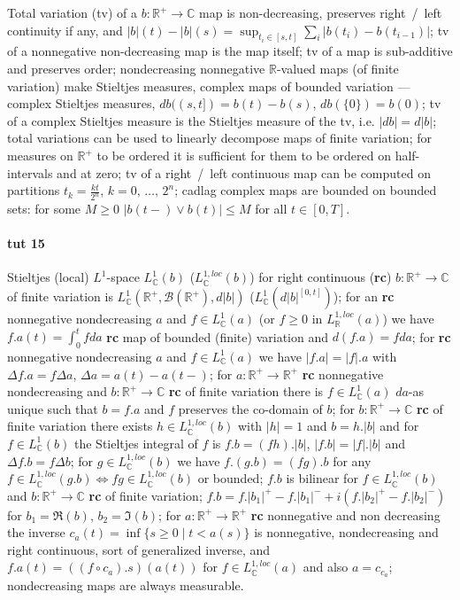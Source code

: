 \documentclass[a4paper]{article}
\newcommand{\Bcal}{\mathcal{B}}
\newcommand{\real}{\mathbb{R}}
\newcommand{\cplx}{\mathbb{C}}
\begin{document}
Total variation (tv) of a $b\colon \real^+ \to \cplx$ map is non-decreasing, preserves right~/~left continuity if any, and $|b|(t) - |b|(s) = \sup_{t_i \in [s, t]} \sum_i |b(t_i) - b(t_{i-1})|$;
tv of a nonnegative non-decreasing map is the map itself;
tv of a map is sub-additive and preserves order;
nondecreasing nonnegative $\real$-valued maps (of finite variation) make Stieltjes measures, complex maps of bounded variation --- complex Stieltjes measures, $db((s,t]) = b(t) - b(s)$, $db(\{0\}) = b(0)$;
tv of a complex Stieltjes measure is the Stieltjes measure of the tv, i.e. $|db| = d|b|$;
total variations can be used to linearly decompose maps of finite variation;
for measures on $\real^+$ to be ordered it is sufficient for them to be ordered on half-intervals and at zero;
tv of a right~/~left continuous map can be computed on partitions $t_k = \tfrac{k t}{2^n}$, $k=0,\, \ldots,\,2^n$;
cadlag complex maps are bounded on bounded sets: for some $M\geq 0$ $|b(t-) \vee b(t)| \leq M$ for all $t \in [0, T]$.



\paragraph{tut 15} %
\label{par:tut_15}

Stieltjes (local) $L^1$-space $L^1_\cplx(b)$ ($L^{1,loc}_\cplx(b)$) for right continuous ({\bf rc}) $b\colon \real^+ \to \cplx$ of finite variation is $L_\cplx^1(\real^+, \Bcal(\real^+), d|b|)$ ($L_\cplx^1(d|b|^{[0,t]})$);
for an {\bf rc} nonnegative nondecreasing $a$ and $f \in L^1_\cplx(a)$ (or $f \geq 0$ in $L^{1,loc}_\real(a)$) we have $f.a(t) = \int_0^t f da$ {\bf rc} map of bounded (finite) variation and $d(f.a) = f da$;
for {\bf rc} nonnegative nondecreasing $a$ and $f \in L^1_\cplx(a)$ we have $|f.a| = |f|.a$ with $\Delta f.a = f\Delta a$, $\Delta a = a(t) - a(t-)$;
for $a\colon \real^+ \to \real^+$ {\bf rc} nonnegative nondecreasing and $b\colon \real^+ \to \cplx$ {\bf rc} of finite variation there is $f \in L^1_\cplx(a)$ $da$-as unique such that $b = f.a$ and $f$ preserves the co-domain of $b$;
for $b\colon \real^+ \to \cplx$ {\bf rc} of finite variation there exists $h \in L^{1,loc}_\cplx(b)$ with $|h|=1$ and $b = h.|b|$ and for $f \in L^1_\cplx(b)$ the Stieltjes integral of $f$ is $f.b = (f h).|b|$, $|f.b| = |f|.|b|$ and $\Delta f.b = f \Delta b$;
for $g \in L^{1,loc}_\cplx(b)$ we have $f.(g.b) = (fg).b$ for any $f \in L^{1,loc}_\cplx(g.b) \Leftrightarrow fg \in L^{1,loc}_\cplx(b)$ or bounded;
$f.b$ is bilinear for $f \in L^{1,loc}_\cplx(b)$ and $b\colon \real^+ \to \cplx$ {\bf rc} of finite variation;
$f.b = f.|b_1|^+ - f.|b_1|^- + i(f.|b_2|^+ - f.|b_2|^-)$ for $b_1 = \Re(b)$, $b_2 = \Im(b)$;
for $a\colon \real^+ \to \real^+$ {\bf rc} nonnegative and non decreasing the inverse $c_a(t) = \inf\{s \geq 0 \mid t < a(s) \}$ is nonnegative, nondecreasing and right continuous, sort of generalized inverse, and $f.a(t) = ((f \circ c_a).s)(a(t))$ for $f \in L^{1,loc}_\cplx(a)$ and also $a = c_{c_a}$;
nondecreasing maps are always measurable.
\end{document}
